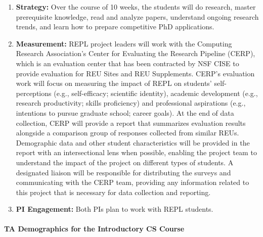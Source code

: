 \begin{enumerate}
\item {\bf Strategy:} Over the course of 10 weeks, the students will do
research, master prerequisite knowledge, read and analyze papers, understand
ongoing research trends, and learn how to prepare competitive PhD applications.
\item {\bf Measurement:}
REPL project leaders will work with the Computing Research Association’s Center for Evaluating the Research Pipeline (CERP), which is an evaluation center that has been contracted by NSF CISE to provide evaluation for REU Sites and REU Supplements. CERP’s evaluation work will focus on measuring the impact of REPL on students’ self-perceptions (e.g., self-efficacy; scientific identity), academic development (e.g., research productivity; skills proficiency) and professional aspirations (e.g., intentions to pursue graduate school; career goals). At the end of data collection, CERP will provide a report that summarizes evaluation results alongside a comparison group of responses collected from similar REUs. Demographic data and other student characteristics will be provided in the report with an intersectional lens when possible, enabling the project team to understand the impact of the project on different types of students. A designated liaison will be responsible for distributing the surveys and communicating with the CERP team, providing any information related to this project that is necessary for data collection and reporting.
\item {\bf PI Engagement:} Both PIs plan to work with REPL students.

\end{enumerate}


\paragraph*{TA Demographics for the Introductory CS Course}

